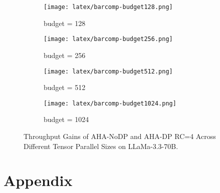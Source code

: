 \begin{figure*}[ht] %
    \centering
    \begin{subfigure}[b]{0.24\textwidth} %
        \texttt{[image: latex/barcomp-budget128.png]}
        \caption{budget = 128}
        \label{fig:image1}
    \end{subfigure}
    \hfill
    \begin{subfigure}[b]{0.24\textwidth}
        \texttt{[image: latex/barcomp-budget256.png]}
        \caption{budget = 256}
        \label{fig:image2}
    \end{subfigure}
    \hfill
    \begin{subfigure}[b]{0.24\textwidth}
        \texttt{[image: latex/barcomp-budget512.png]}
        \caption{budget = 512}
        \label{fig:image3}
    \end{subfigure}
    \hfill
    \begin{subfigure}[b]{0.24\textwidth}
        \texttt{[image: latex/barcomp-budget1024.png]}
        \caption{budget = 1024} 
        \label{fig:image4}
    \end{subfigure}
    \caption{Throughput Gains of AHA-NoDP and AHA-DP RC=4 Across Different Tensor Parallel Sizes on LLaMa-3.3-70B.}
    \label{fig:gainsacrossgpu}
\end{figure*}


\appendix

\section{Appendix}
\label{sec:appendix}

